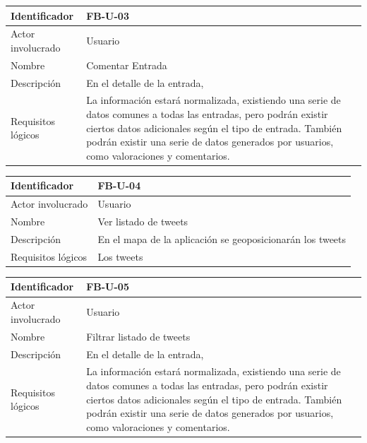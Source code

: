 \begin{table}[h!]
\centering
\begin{tabular}{|p{3cm}|p{10cm}|}
\hline
Identificador & FB-U-03 \\ \hline
Actor involucrado & Usuario \\ \hline
Nombre & Comentar Entrada\\ \hline
Descripción & En el detalle de la entrada,  \\ \hline
Requisitos lógicos & La información estará normalizada, existiendo una serie de datos comunes a todas las entradas, pero podrán existir ciertos datos adicionales según el tipo de entrada. También podrán existir una serie de datos generados por usuarios, como valoraciones y comentarios. \\ \hline
\end{tabular}
\end{table}

\begin{table}[h!]
\centering
\begin{tabular}{|p{3cm}|p{10cm}|}
\hline
Identificador & FB-U-04 \\ \hline
Actor involucrado & Usuario \\ \hline
Nombre & Ver listado de tweets\\ \hline
Descripción & En el mapa de la aplicación se geoposicionarán los tweets  \\ \hline
Requisitos lógicos & Los tweets \\ \hline
\end{tabular}
\end{table}


\begin{table}[h!]
\centering
\begin{tabular}{|p{3cm}|p{10cm}|}
\hline
Identificador & FB-U-05 \\ \hline
Actor involucrado & Usuario \\ \hline
Nombre & Filtrar listado de tweets\\ \hline
Descripción & En el detalle de la entrada,  \\ \hline
Requisitos lógicos & La información estará normalizada, existiendo una serie de datos comunes a todas las entradas, pero podrán existir ciertos datos adicionales según el tipo de entrada. También podrán existir una serie de datos generados por usuarios, como valoraciones y comentarios. \\ \hline
\end{tabular}
\end{table}

